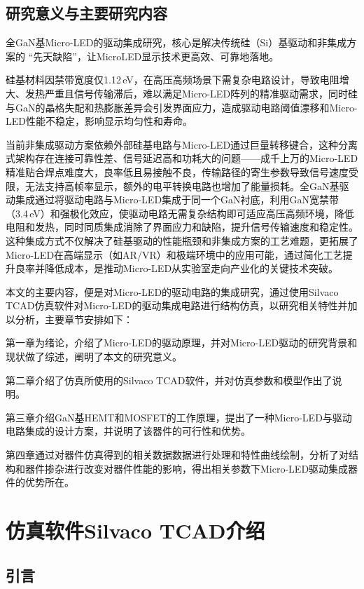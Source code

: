 \documentclass[
    oneside,                %
    fontset = win, %
  ]{njuthesis}
\begin{document}
\section{研究意义与主要研究内容}

全GaN基Micro-LED的驱动集成研究，核心是解决传统硅（Si）基驱动和非集成方案的 “先天缺陷”，让MicroLED显示技术更高效、可靠地落地。

硅基材料因禁带宽度仅1.12\,eV，在高压高频场景下需复杂电路设计，导致电阻增大、发热严重且信号传输滞后，难以满足Micro-LED阵列的精准驱动需求，同时硅与GaN的晶格失配和热膨胀差异会引发界面应力，造成驱动电路阈值漂移和Micro-LED性能不稳定\cite{selvaraj2018heterogeneous}，影响显示均匀性和寿命。

当前非集成驱动方案依赖外部硅基电路与Micro-LED通过巨量转移键合，这种分离式架构存在连接可靠性差、信号延迟高和功耗大的问题——成千上万的Micro-LED精准贴合焊点难度大，良率低且易接触不良，传输路径的寄生参数导致信号速度受限，无法支持高帧率显示，额外的电平转换电路也增加了能量损耗。全GaN基驱动集成通过将驱动电路与Micro-LED集成于同一个GaN衬底，利用GaN宽禁带（3.4\,eV）和强极化效应，使驱动电路无需复杂结构即可适应高压高频环境，降低电阻和发热，同时同质集成消除了界面应力和缺陷，提升信号传输速度和稳定性\cite{zhu2022improved}。这种集成方式不仅解决了硅基驱动的性能瓶颈和非集成方案的工艺难题，更拓展了Micro-LED在高端显示（如AR/VR）和极端环境中的应用可能，通过简化工艺提升良率并降低成本，是推动Micro-LED从实验室走向产业化的关键技术突破。

本文的主要内容，便是对Micro-LED的驱动电路的集成研究，通过使用Silvaco TCAD仿真软件对Micro-LED的驱动集成电路进行结构仿真，以研究相关特性并加以分析，主要章节安排如下：

第一章为绪论，介绍了Micro-LED的驱动原理，并对Micro-LED驱动的研究背景和现状做了综述，阐明了本文的研究意义。

第二章介绍了仿真所使用的Silvaco TCAD软件，并对仿真参数和模型作出了说明。

第三章介绍GaN基HEMT和MOSFET的工作原理，提出了一种Micro-LED与驱动电路集成的设计方案，并说明了该器件的可行性和优势。

第四章通过对器件仿真得到的相关数据数据进行处理和特性曲线绘制，分析了对结构和器件掺杂进行改变对器件性能的影响，得出相关参数下Micro-LED驱动集成器件的优势所在。


\chapter{仿真软件Silvaco TCAD介绍}

\section{引言}
\end{document}

